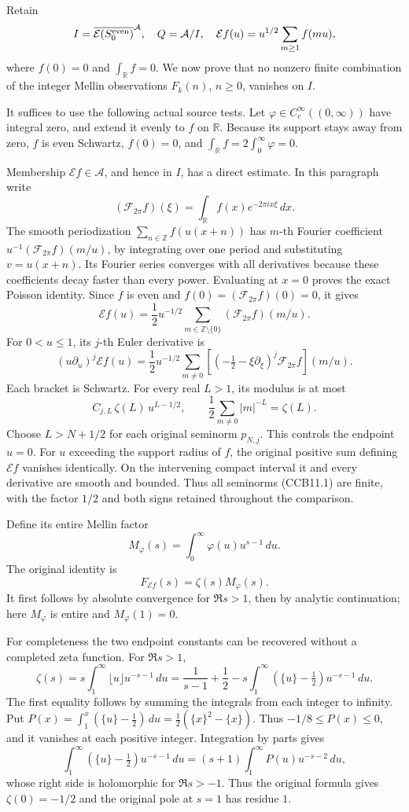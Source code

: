 Retain \[
I=\overline{\mathcal E(S_0^{\rm even})}^{\mathcal A},\quad
Q=\mathcal A/I,\quad
\mathcal E f(u)=u^{1/2}\sum_{m\ge1}f(mu),
\] where \(f(0)=0\) and \(\int_{\mathbb R}f=0\). We now prove that no
nonzero finite combination of the integer Mellin observations
\(F_k(n)\), \(n\ge0\), vanishes on \(I\).

It suffices to use the following actual source tests. Let
\(\varphi\in C_c^\infty((0,\infty))\) have integral zero, and extend it
evenly to \(f\) on \(\mathbb R\). Because its support stays away from
zero, \(f\) is even Schwartz, \(f(0)=0\), and
\(\int_{\mathbb R}f=2\int_0^\infty\varphi=0\).

Membership \(\mathcal Ef\in\mathcal A\), and hence in \(I\), has a
direct estimate. In this paragraph write \[
(\mathcal F_{2\pi}f)(\xi)=\int_{\mathbb R}f(x)e^{-2\pi ix\xi}\,dx.
\] The smooth periodization \(\sum_{n\in\mathbb Z}f(u(x+n))\) has
\(m\)-th Fourier coefficient \(u^{-1}(\mathcal F_{2\pi}f)(m/u)\), by
integrating over one period and substituting \(v=u(x+n)\). Its Fourier
series converges with all derivatives because these coefficients decay
faster than every power. Evaluating at \(x=0\) proves the exact Poisson
identity. Since \(f\) is even and \(f(0)=(\mathcal F_{2\pi}f)(0)=0\), it
gives \[
\mathcal Ef(u)=\frac12u^{-1/2}
\sum_{m\in\mathbb Z\setminus\{0\}}(\mathcal F_{2\pi}f)(m/u).
\] For \(0<u\le1\), its \(j\)-th Euler derivative is \[
(u\partial_u)^j\mathcal Ef(u)=
\frac12u^{-1/2}\sum_{m\ne0}
\left[(-\tfrac12-\xi\partial_\xi)^j\mathcal F_{2\pi}f\right](m/u).
\] Each bracket is Schwartz. For every real \(L>1\), its modulus is at
most \[
C_{j,L}\,\zeta(L)\,u^{L-1/2},
\qquad \frac12\sum_{m\ne0}|m|^{-L}=\zeta(L).
\] Choose \(L>N+1/2\) for each original seminorm \(p_{N,j}\). This
controls the endpoint \(u=0\). For \(u\) exceeding the support radius of
\(f\), the original positive sum defining \(\mathcal Ef\) vanishes
identically. On the intervening compact interval it and every derivative
are smooth and bounded. Thus all seminorms (CCB11.1) are finite, with
the factor \(1/2\) and both signs retained throughout the comparison.

Define its entire Mellin factor \[
M_\varphi(s)=\int_0^\infty\varphi(u)u^{s-1}\,du.
\] The original identity is \[
F_{\mathcal Ef}(s)=\zeta(s)M_\varphi(s).
\tag{CCB15.1}
\] It first follows by absolute convergence for \(\Re s>1\), then by
analytic continuation; here \(M_\varphi\) is entire and
\(M_\varphi(1)=0\).

For completeness the two endpoint constants can be recovered without a
completed zeta function. For \(\Re s>1\), \[
\zeta(s)
=s\int_1^\infty\lfloor u\rfloor u^{-s-1}\,du
=\frac1{s-1}+\frac12
-s\int_1^\infty(\{u\}-\tfrac12)u^{-s-1}\,du.
\tag{CCB15.2}
\] The first equality follows by summing the integrals from each integer
to infinity. Put \(P(x)=\int_1^x(\{u\}-\tfrac12)\,du
=\tfrac12(\{x\}^2-\{x\})\). Thus \(-1/8\le P(x)\le0\), and it vanishes
at each positive integer. Integration by parts gives \[
\int_1^\infty(\{u\}-\tfrac12)u^{-s-1}\,du
=(s+1)\int_1^\infty P(u)u^{-s-2}\,du,
\] whose right side is holomorphic for \(\Re s>-1\). Thus the original
formula gives \(\zeta(0)=-1/2\) and the original pole at \(s=1\) has
residue \(1\).

